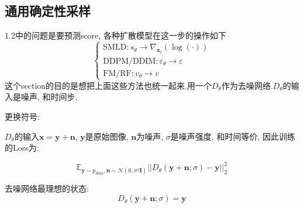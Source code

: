\subsection{通用确定性采样}

1.2中的问题是要预测score, 各种扩散模型在这一步的操作如下
$$
\begin{cases}
    \text{SMLD}: s_{\theta} \longrightarrow \nabla_{\mathbf{x}_{t}}(\log(\cdot)) \\
    \text{DDPM/DDIM}: \varepsilon_{\theta} \longrightarrow \varepsilon \\
    \text{FM/RF}: v_{\theta}\longrightarrow v
\end{cases}
$$
这个section的目的是想把上面这些方法也统一起来.用一个$D_{\theta}$作为去噪网络.$D_{\theta}$的输入是噪声, 和时间步.

更换符号:

$D_{\theta}$的输入$\mathbf{x}=\mathbf{y}+\mathbf{n}$, $\mathbf{y}$是原始图像, $\mathbf{n}$为噪声, $\sigma$是噪声强度, 和时间等价, 因此训练的Loss为:

$$
\mathbb{E}_{\mathbf{y}\sim p_{data}, \mathbf{n}\sim\mathcal{N}(0, \sigma^{2}\mathbf{I})}
||D_{\theta}(\mathbf{y}+\mathbf{n}; \sigma)-\mathbf{y}||^{2}_{2}
$$

去噪网络最理想的状态:
$$
D_{\theta}(\mathbf{y}+\mathbf{n}; \sigma) = \mathbf{y}
$$
